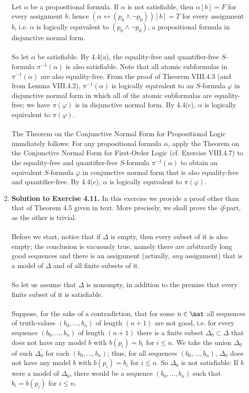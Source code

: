 \begin{enumerate}[1.]
\ \\
Let $\alpha$ be a propositional formula. If $\alpha$ is not satisfiable, then $\alpha [b] = F$ for every assignment $b$; hence $(\alpha \leftrightarrow (p_0 \land \neg p_0))[b] = T$ for every assignment $b$, i.e. $\alpha$ is logically equivalent to $(p_0 \land \neg p_0)$, a propositional formula in disjunctive normal form.\\
\ \\
So let $\alpha$ be satisfiable. By 4.4(a), the equality-free and quantifier-free $S$-formula $\pi^{-1} ( \alpha )$ is also satisfiable. Note that all atomic subformulas in $\pi^{-1} ( \alpha )$ are also equality-free. From the proof of Theorem VIII.4.3 (and from Lemma VIII.4.2), $\pi^{-1} ( \alpha )$ is logically equivalent to an $S$-formula $\varphi$ in disjunctive normal form in which all of the atomic subformulas are equality-free; we have $\pi ( \varphi )$ is in disjunctive normal form. By 4.4(c), $\alpha$ is logically equivalent to $\pi ( \varphi )$.\\
\ \\
The Theorem on the Conjunctive Normal Form for Propositional Logic immdiately follows: For any propositional formula $\alpha$, apply the Theorem on the Conjunctive Normal Form for First-Order Logic (cf. Exercise VIII.4.7) to the equality-free and quantifier-free $S$-formula $\pi^{-1}( \alpha )$ to obtain an equivalent $S$-formula $\varphi$ in conjunctive normal form that is also equality-free and quantifier-free. By 4.4(c), $\alpha$ is logically equivalent to $\pi ( \varphi )$.
%
\item \textbf{Solution to Exercise 4.11.} In this exercise we provide a proof other than that of Theorem 4.5 given in text. More precisely, we shall prove the \emph{if}-part, as the other is trivial.\\
\ \\
Before we start, notice that if $\Delta$ is empty, then every subset of it is also empty; the conclusion is vacuously true, namely there are arbitrarily long good sequences and there is an assignment (actually, \emph{any} assignment) that is a model of $\Delta$ and of all finite subsets of it.\\
\ \\
So let us assume that $\Delta$ is nonempty, in addition to the premise that every finite subset of it is satisfiable.\\
\ \\
Suppose, for the sake of a contradiction, that for some $n \in \nat$ all sequences of truth-values $(b_0, \ldots, b_n)$ of length $(n + 1)$ are not good, i.e. for every sequence $(b_0, \ldots, b_n)$ of length $(n + 1)$ there is a finite subset $\Delta_0^\prime \subset \Delta$ that does not have any model $b$ with $b(p_i) = b_i$ for $i \leq n$. We take the union $\Delta_0$ of such $\Delta_0^\prime$ for each $(b_0, \ldots, b_n)$; thus, for all sequences $(b_0, \ldots, b_n)$, $\Delta_0$ does not have any model $b$ with $b(p_i) = b_i$ for $i \leq n$. So $\Delta_0$ is not satisfiable: If $b$ were a model of $\Delta_0$, there would be a sequence $(b_0, \ldots, b_n)$ such that $b_i = b(p_i)$ for $i \leq n$.\\

\end{enumerate}
